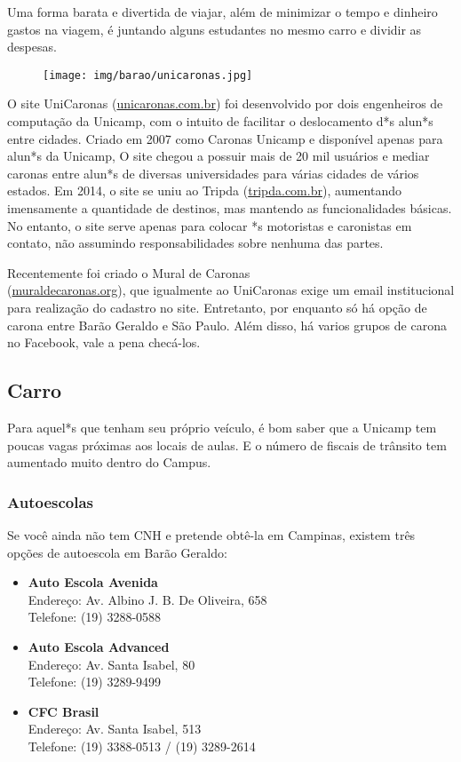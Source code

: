 Uma forma barata e divertida de viajar, além de minimizar o tempo e dinheiro
gastos na viagem, é juntando alguns estudantes no mesmo carro e dividir as
despesas.
\begin{figure}[h!]  \centering
    \texttt{[image: img/barao/unicaronas.jpg]}
\end{figure}

O site UniCaronas (\url{unicaronas.com.br}) foi desenvolvido por dois
engenheiros de computação da Unicamp, com o intuito de facilitar o deslocamento
d*s alun*s entre cidades. Criado em 2007 como Caronas Unicamp e disponível
apenas para alun*s da Unicamp, O site chegou a possuir mais de 20 mil usuários e
mediar caronas entre alun*s de diversas universidades para várias cidades de
vários estados. Em 2014, o site se uniu ao Tripda (\url{tripda.com.br}),
aumentando imensamente a quantidade de destinos, mas mantendo as funcionalidades
básicas. No entanto, o site serve apenas para colocar *s motoristas e caronistas
em contato, não assumindo responsabilidades sobre nenhuma das partes.

Recentemente foi criado o Mural de Caronas\\(\url{muraldecaronas.org}), que
igualmente ao UniCaronas exige um email institucional para realização do
cadastro no site. Entretanto, por enquanto só há opção de carona entre Barão
Geraldo e São Paulo. Além disso, há varios grupos de carona no Facebook, vale a
pena checá-los.

\subsection{Carro}

Para aquel*s que tenham seu próprio veículo, é bom saber que a Unicamp tem
poucas vagas próximas aos locais de aulas. E o número de fiscais de trânsito tem
aumentado muito dentro do Campus.

\subsubsection{Autoescolas}

Se você ainda não tem CNH e pretende obtê-la em Campinas, existem três opções de
autoescola em Barão Geraldo:

\begin{itemize}
    \item \textbf{Auto Escola Avenida} 
        \\Endereço: Av. Albino J. B. De Oliveira, 658 
        \\Telefone: (19) 3288-0588

    \item \textbf{Auto Escola Advanced} 
        \\Endereço: Av. Santa Isabel, 80
        \\Telefone: (19) 3289-9499

    \item \textbf{CFC Brasil} 
        \\Endereço: Av. Santa Isabel, 513
        \\Telefone: (19) 3388-0513 / (19) 3289-2614
\end{itemize}

